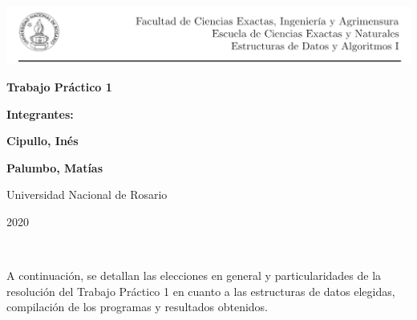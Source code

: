\documentclass[11pt]{article}
\begin{document}
\begin{titlepage}
    \hspace{-1.2cm}\includegraphics[scale= 0.8]{header2}
    \begin{center}
        \vfill
        \vfill
            \vspace{0.7cm}
            \noindent\textbf{\Huge Trabajo Práctico 1}\par
            \vspace{.5cm}
        \vfill
        \noindent \textbf{\huge Integrantes:}\par
        \vspace{.5cm}
        \noindent \textbf{\Large Cipullo, Inés}\par
        \noindent \textbf{\Large Palumbo, Matías}\par
        
 
        \vfill
        \large Universidad Nacional de Rosario \par
        \noindent\large 2020
             
    \end{center}
 \end{titlepage}
 \ \par
\noindent A continuación, se detallan las elecciones en general y particularidades de la resolución del Trabajo Práctico 1 en cuanto a las estructuras de datos elegidas, compilación de los programas y resultados obtenidos.\par
\end{document}
